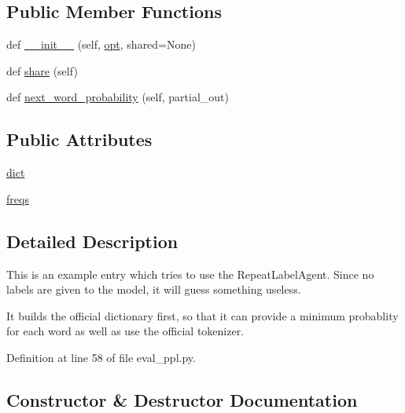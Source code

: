 \subsection*{Public Member Functions}
\begin{DoxyCompactItemize}
\item 
def \hyperlink{classconvai2_1_1eval__ppl_1_1WordFrequencyEntry_a06a52444ed965dc724864f5a6503a410}{\+\_\+\+\_\+init\+\_\+\+\_\+} (self, \hyperlink{classparlai_1_1core_1_1agents_1_1Agent_ab3b45d2754244608c75d4068b90cd051}{opt}, shared=None)
\item 
def \hyperlink{classconvai2_1_1eval__ppl_1_1WordFrequencyEntry_a7c5da99b28c3c7e03eaac7079d7d608c}{share} (self)
\item 
def \hyperlink{classconvai2_1_1eval__ppl_1_1WordFrequencyEntry_a8dace8d727764609e2cc305e79fab2a5}{next\+\_\+word\+\_\+probability} (self, partial\+\_\+out)
\end{DoxyCompactItemize}
\subsection*{Public Attributes}
\begin{DoxyCompactItemize}
\item 
\hyperlink{classconvai2_1_1eval__ppl_1_1WordFrequencyEntry_aaffbcedf94769977f77c38e9587b980c}{dict}
\item 
\hyperlink{classconvai2_1_1eval__ppl_1_1WordFrequencyEntry_a6afe352975394701e253b6c7c9980774}{freqs}
\end{DoxyCompactItemize}


\subsection{Detailed Description}
\begin{DoxyVerb}This is an example entry which tries to use the RepeatLabelAgent.
Since no labels are given to the model, it will guess something useless.

It builds the official dictionary first, so that it can provide a minimum
probablity for each word as well as use the official tokenizer.
\end{DoxyVerb}
 

Definition at line 58 of file eval\+\_\+ppl.\+py.



\subsection{Constructor \& Destructor Documentation}
\mbox{\label{classconvai2_1_1eval__ppl_1_1WordFrequencyEntry_a06a52444ed965dc724864f5a6503a410}} 
